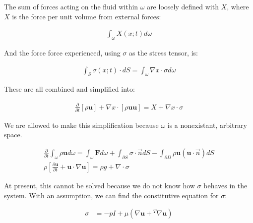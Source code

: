The sum of forces acting on the fluid within $\omega$ are loosely defined with $X$, where $X$ is the force per unit volume from external forces:

\begin{equation} \label{phenom1}
\begin{split}
\int_\omega X(x;t)d\omega
\end{split}
\end{equation}

And the force force experienced, using $\sigma$ as the stress tensor, is:

\begin{equation} \label{phenom1}
\begin{split}
\int_S \sigma(x;t)\cdot dS = \int_\omega \nabla x \cdot \sigma d\omega
\end{split}
\end{equation}

These are all combined and simplified into: 

\begin{equation} \label{phenom1}
\begin{split}
\frac{\partial}{\partial t}[\rho \mathbf{u}] + \nabla x \cdot [\rho\mathbf{u}\mathbf{u}] = X + \nabla x \cdot \sigma
\end{split}
\end{equation}

We are allowed to make this simplification because $\omega$ is a nonexistant, arbitrary space. 







\begin{equation} \label{phenom1}
\begin{split}
\frac{\partial}{\partial t}\int_\omega \rho\mathbf{u}d\omega = \int_\omega \mathbf{F}d\omega + \int_{\partial S}\sigma \cdot \Vec{n}dS - \int_{\partial D}\rho \mathbf{u}(\mathbf{u}\cdot\Vec{n})dS\\
\rho[\frac{\partial \mathbf{u}}{\partial t} + \mathbf{u}\cdot\nabla \mathbf{u}] = \rho g + \nabla \cdot \sigma
\end{split}
\end{equation}

At present, this cannot be solved because we do not know how $\sigma$ behaves in the system. With an assumption, we can find the constitutive equation for $\sigma$:

\begin{equation} \label{phenom1}
\begin{split}
\sigma &= -p I + \mu(\nabla\mathbf{u} + {}^T\nabla\mathbf{u})
\end{split}
\end{equation}

